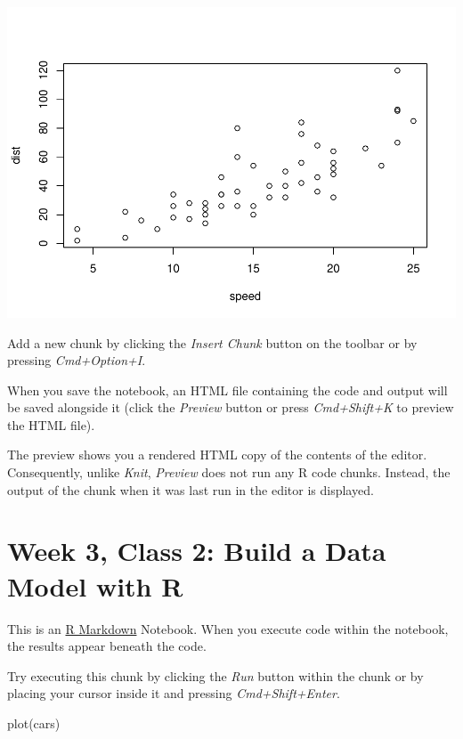 \documentclass[
]{book}
\newenvironment{Shaded}{\begin{snugshade}}{\end{snugshade}}
\newcommand{\FunctionTok}[1]{\textcolor[rgb]{0.00,0.00,0.00}{#1}}
\newcommand{\NormalTok}[1]{#1}
\begin{document}
\includegraphics{_main_files/figure-latex/unnamed-chunk-31-1.pdf}

Add a new chunk by clicking the \emph{Insert Chunk} button on the toolbar or by pressing \emph{Cmd+Option+I}.

When you save the notebook, an HTML file containing the code and output will be saved alongside it (click the \emph{Preview} button or press \emph{Cmd+Shift+K} to preview the HTML file).

The preview shows you a rendered HTML copy of the contents of the editor. Consequently, unlike \emph{Knit}, \emph{Preview} does not run any R code chunks. Instead, the output of the chunk when it was last run in the editor is displayed.

\hypertarget{week-3-class-2-build-a-data-model-with-r}{%
\chapter{Week 3, Class 2: Build a Data Model with R}\label{week-3-class-2-build-a-data-model-with-r}}

This is an \href{http://rmarkdown.rstudio.com}{R Markdown} Notebook. When you execute code within the notebook, the results appear beneath the code.

Try executing this chunk by clicking the \emph{Run} button within the chunk or by placing your cursor inside it and pressing \emph{Cmd+Shift+Enter}.

\begin{Shaded}
\begin{Highlighting}[]
\FunctionTok{plot}\NormalTok{(cars)}
\end{Highlighting}
\end{Shaded}
\end{document}
